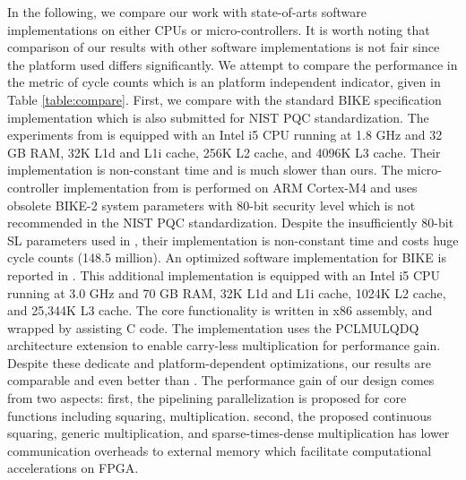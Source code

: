 \documentclass[preprint]{iacrtrans}
\begin{document}
In the following, we compare our work with state-of-arts software implementations on either CPUs or micro-controllers. It is worth noting that comparison of our results with other software implementations is not fair since the platform used differs significantly. We attempt to compare the performance in the metric of cycle counts which is an platform independent indicator, given in Table \ref{table:compare}.
First, we compare with the standard BIKE specification implementation \cite{aragon2017bike} which is also submitted for NIST PQC standardization. The experiments from \cite{von2014lightweight} is equipped with an Intel i5 CPU running at 1.8 GHz and 32 GB RAM, 32K L1d and L1i cache, 256K L2 cache, and 4096K L3 cache. Their implementation is non-constant time and is much slower than ours. The micro-controller implementation from \cite{maurich2015implementing} is performed on ARM Cortex-M4 and uses obsolete BIKE-2 system parameters with 80-bit security level which is not recommended in the NIST PQC standardization. Despite the insufficiently 80-bit SL parameters used in \cite{maurich2015implementing}, their implementation is non-constant time and costs huge cycle counts (148.5 million).  An optimized software implementation for BIKE is reported in \cite{drucker2017toolbox}. This additional implementation is equipped with an Intel i5 CPU running at 3.0 GHz and 70 GB RAM, 32K L1d and L1i cache, 1024K L2 cache, and 25,344K L3 cache. The core functionality is written in x86 assembly, and wrapped by assisting C code.
The implementation uses the PCLMULQDQ architecture extension to enable carry-less multiplication for performance gain. Despite these dedicate and platform-dependent optimizations, our results are comparable and even better than \cite{drucker2017toolbox}. The performance gain of our design comes from two aspects: first, the pipelining parallelization is proposed for core functions including squaring, multiplication. second, the proposed continuous squaring, generic multiplication, and sparse-times-dense multiplication has lower communication overheads to external memory which facilitate computational accelerations on FPGA.
\end{document}
